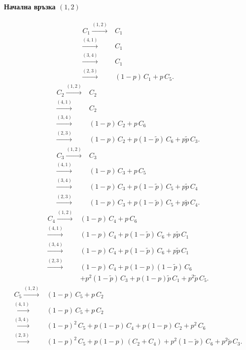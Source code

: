 \documentclass[a4paper,10pt]{article}
\begin{document}
\paragraph{Начална връзка $(1,2)$}
\begin{equation}
\begin{split}
C_1 \xrightarrow{(1,2)}& C_1\\
    \xrightarrow{(4,1)}& C_1\\
    \xrightarrow{(3,4)}& C_1\\
    \xrightarrow{(2,3)}& (1-p)\,C_1 + p\,C_5.
\end{split}
\end{equation}
%
\begin{equation}
\begin{split}
C_2 \xrightarrow{(1,2)}& C_2\\
    \xrightarrow{(4,1)}& C_2\\
    \xrightarrow{(3,4)}& (1-p)\,C_2 + p\,C_6\\
    \xrightarrow{(2,3)}& (1-p)\,C_2 + p(1-\tilde{p})\,C_6 + p\tilde{p}\,C_3.
\end{split}
\end{equation}
%
\begin{equation}
\begin{split}
C_3 \xrightarrow{(1,2)}& C_3\\
    \xrightarrow{(4,1)}& (1-p)\,C_3 + p\,C_5\\
    \xrightarrow{(3,4)}& (1-p)\,C_3 + p(1-\tilde{p})\,C_5 + p\tilde{p}\,C_4\\
    \xrightarrow{(2,3)}& (1-p)\,C_3 + p(1-\tilde{p})\,C_5 + p\tilde{p}\,C_4.
\end{split}
\end{equation}
%
\begin{equation}
\begin{split}
C_4 \xrightarrow{(1,2)}& (1-p)\,C_4 + p\,C_6\\
    \xrightarrow{(4,1)}& (1-p)\,C_4 + p(1-\tilde{p})\,C_6 + p\tilde{p}\,C_1\\
    \xrightarrow{(3,4)}& (1-p)\,C_4 + p(1-\tilde{p})\,C_6 + p\tilde{p}\,C_1\\
    \xrightarrow{(2,3)}& (1-p)\,C_4 + p(1-p)(1-\tilde{p})\,C_6\\
    & + p^2(1-\tilde{p})\,C_3 + p(1-p)\tilde{p}\,C_1 + p^2\tilde{p}\,C_5.
\end{split}
\end{equation}
%
\begin{equation}
\begin{split}
C_5 \xrightarrow{(1,2)}& (1-p)\,C_5 + p\,C_2\\
    \xrightarrow{(4,1)}& (1-p)\,C_5 + p\,C_2\\
    \xrightarrow{(3,4)}& (1-p)^2\,C_5 + p(1-p)\,C_4 + p(1-p)\,C_2 + p^2\,C_6\\
    \xrightarrow{(2,3)}& (1-p)^2\,C_5 + p(1-p)\,(C_2 + C_4) + p^2(1-\tilde{p})\,C_6 + p^2\tilde{p}\,C_3.
\end{split}
\end{equation}
\end{document}
